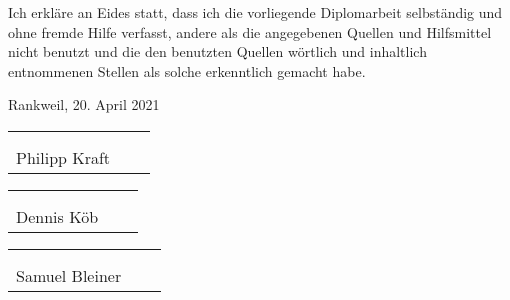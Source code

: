 Ich erkläre an Eides statt, dass ich die vorliegende Diplomarbeit selbständig
und ohne fremde Hilfe verfasst, andere als die angegebenen Quellen und
Hilfsmittel nicht benutzt und die den benutzten Quellen wörtlich und inhaltlich
entnommenen Stellen als solche erkenntlich gemacht habe.

\vspace*{1cm}
Rankweil, 20. April 2021

\vspace*{2cm}


\begin{center}
  \begin{tabular}{cp{2em}c} \hspace{6cm} \\\cline{1-1}\cline{3-3} \\[-3mm]
    {\footnotesize Philipp Kraft}
  \end{tabular}

  \vspace*{1cm}

  \begin{tabular}{cp{2em}c} \hspace{6cm} \\\cline{1-1}\cline{3-3} \\[-3mm]
    {\footnotesize Dennis Köb}
  \end{tabular}

  \vspace*{1cm}

  \begin{tabular}{cp{2em}c} \hspace{6cm} \\\cline{1-1}\cline{3-3} \\[-3mm]
    {\footnotesize Samuel Bleiner}
  \end{tabular}

\end{center}

